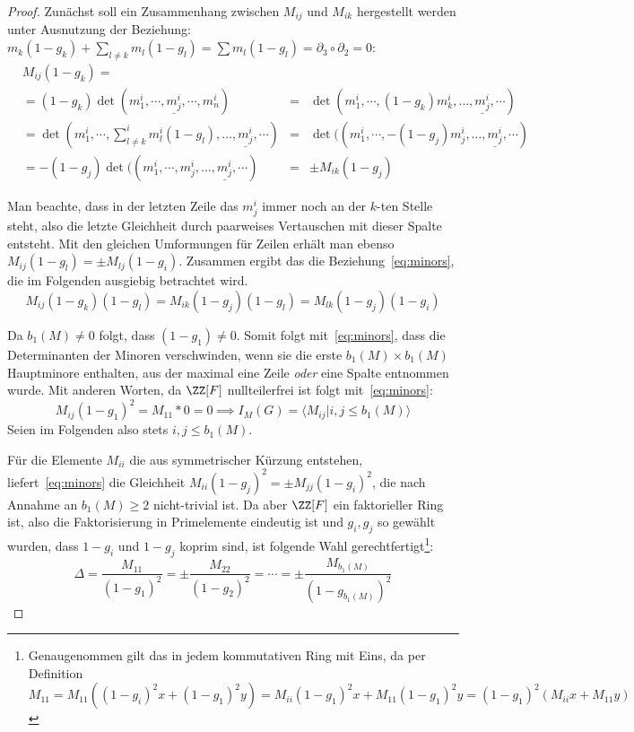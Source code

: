 \begin{proof}
	Zunächst soll ein Zusammenhang zwischen $M_{ij}$ und $M_{ik}$ hergestellt werden unter Ausnutzung der Beziehung: $m_k(1-g_k)+\sum_{l \neq k}m_l(1-g_l)= \sum m_l(1-g_l)=\partial_3 \circ \partial_2 =0$:
	\begin{align*}
	&M_{ij}(1-g_k)=\\
	&	=(1-g_k)\det(m^i_1,\cdots,\underline {m^i_j},\cdots,m^i_n)&=& \det(m^i_1,\cdots,(1-g_k)m^i_k,\dots,\underline {m^i_j},\cdots)\\
	&				 =\det(m^i_1,\cdots,\sum^i_{l \neq k}m^i_l(1-g_l),\dots,\underline {m^i_j},\cdots) &=&\det((m^i_1,\cdots,-(1-g_j)m^i_j,\dots,\underline {m^i_j},\cdots)\\
	&				 =-(1-g_j)\det((m^i_1,\cdots,m^i_j,\dots,\underline {m^i_j},\cdots) &=& \pm M_{ik}(1-g_j)
	\end{align*}

	Man beachte, dass in der letzten Zeile das $m_j^i$ immer noch an der $k$-ten Stelle steht, also die letzte Gleichheit durch paarweises Vertauschen mit dieser Spalte entsteht. Mit den gleichen Umformungen für Zeilen erhält man ebenso $M_{ij}(1-g_l)=\pm M_{lj}(1-g_i)$. Zusammen ergibt das die Beziehung~\eqref{eq:minors}, die im Folgenden ausgiebig betrachtet wird.
	\begin{equation}
		M_{ij}(1-g_k)(1-g_l)=M_{ik}(1-g_j)(1-g_l)=M_{lk}(1-g_j)(1-g_i) \label{eq:minors}
	\end{equation}

	Da $b_1(M)\neq 0$ folgt, dass $(1-g_1)\neq 0$. Somit folgt mit~\eqref{eq:minors}, dass die Determinanten der Minoren verschwinden, wenn sie die erste $b_1(M)\times b_1(M)$ Hauptminore enthalten, aus der maximal eine Zeile \emph{oder} eine Spalte entnommen wurde. Mit anderen Worten, da $\ZZ[F]$ nullteilerfrei ist folgt mit~\eqref{eq:minors}:
	\[
		M_{ij}(1-g_1)^2 = M_{11}*0=0 \implies I_M(G)= \langle M_{ij}|i,j \leq b_1(M) \rangle
	\]
	Seien im Folgenden also stets $i,j\leq b_1(M)$.

	Für die Elemente $M_{ii}$ die aus symmetrischer Kürzung entstehen, liefert~\eqref{eq:minors} die Gleichheit $M_{ii}(1-g_j)^2=\pm M_{jj}(1-g_i)^2$, die nach Annahme an $b_1(M)\geq 2$ nicht-trivial ist. Da aber $\ZZ[F]$ ein faktorieller Ring ist, also die Faktorisierung in Primelemente eindeutig ist und $g_i,g_j$ so gewählt wurden, dass $1-g_i$ und $1-g_j$ koprim sind, ist folgende Wahl gerechtfertigt\footnote{Genaugenommen gilt das in jedem kommutativen Ring mit Eins, da per Definition $$M_{11}=M_{11}((1-g_i)^2x +(1-g_1)^2 y)= M_{ii}(1-g_1)^2x + M_{11}(1-g_1)^2y =(1-g_1)^2 (M_{ii}x+ M_{11} y)$$}:
	\[
		\Delta = \frac{M_{11}}{(1-g_1)^2} = \pm \frac{M_{22}}{(1-g_2)^2} = \cdots = \pm \frac{M_{b_1(M)}}{(1-g_{b_1(M)})^2}
	\]


\end{proof}
